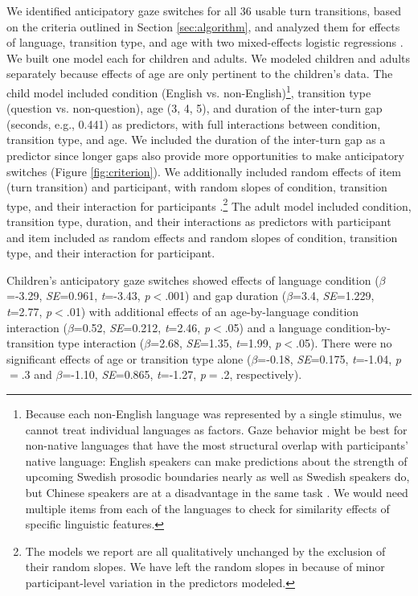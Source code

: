 \documentclass[authoryear, 12pt]{elsarticle}
\begin{document}
We identified anticipatory gaze switches for all 36 usable turn transitions, based on the criteria outlined in Section \ref{sec:algorithm}, and analyzed them for effects of language, transition type, and age with two mixed-effects logistic regressions \citep{lme4, R}. We built one model each for children and adults. We modeled children and adults separately because effects of age are only pertinent to the children's data. The child model included condition (English vs. non-English)\footnote{Because each non-English language was represented by a single stimulus, we cannot treat individual languages as factors. Gaze behavior might be best for non-native languages that have the most structural overlap with participants' native language: English speakers can make predictions about the strength of upcoming Swedish prosodic boundaries nearly as well as Swedish speakers do, but Chinese speakers are at a disadvantage in the same task \citep{carlson2005}. We would need multiple items from each of the languages to check for similarity effects of specific linguistic features.}, transition type (question vs. non-question), age (3, 4, 5), and duration of the inter-turn gap (seconds, e.g., 0.441) as predictors, with full interactions between condition, transition type, and age.  We included the duration of the inter-turn gap as a predictor since longer gaps also provide more opportunities to make anticipatory switches (Figure \ref{fig:criterion}). We additionally included random effects of item (turn transition) and participant, with random slopes of condition, transition type, and their interaction for participants \citep{barr2013}.\footnote{The models we report are all qualitatively unchanged by the exclusion of their random slopes. We have left the random slopes in because of minor participant-level variation in the predictors modeled.} The adult model included condition, transition type, duration, and their interactions as predictors with participant and item included as random effects and random slopes of condition, transition type, and their interaction for participant.

Children's anticipatory gaze switches showed effects of language condition (\textit{$\beta$}=-3.29, \textit{SE}=0.961, \textit{t}=-3.43, \textit{p}$<$.001) and gap duration (\textit{$\beta$}=3.4, \textit{SE}=1.229, \textit{t}=2.77, \textit{p}$<$.01) with additional effects of an age-by-language condition interaction (\textit{$\beta$}=0.52, \textit{SE}=0.212, \textit{t}=2.46, \textit{p}$<$.05) and a language condition-by-transition type interaction (\textit{$\beta$}=2.68, \textit{SE}=1.35, \textit{t}=1.99, \textit{p}$<$.05). There were no significant effects of age or transition type alone (\textit{$\beta$}=-0.18, \textit{SE}=0.175, \textit{t}=-1.04, \textit{p}$=$.3 and \textit{$\beta$}=-1.10, \textit{SE}=0.865, \textit{t}=-1.27, \textit{p}$=$.2, respectively). 
\end{document}
